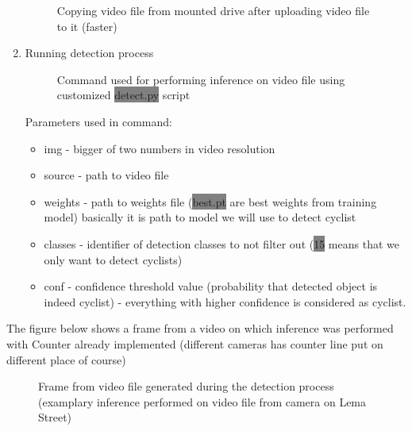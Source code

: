 \begin{enumerate}
\begin{figure} [h]
        \caption{Copying video file from mounted drive after uploading video file to it (faster)}
        \label{fig:inference3}
    \end{figure}
    \item Running detection process
    \newline \begin{figure} [h]
        \centering
        \caption{Command used for performing inference on video file using customized \colorbox{Gray}{detect.py} script}
        \label{fig:inference4}
    \end{figure}
    \newline Parameters used in command:
    \begin{itemize}
        \item img - bigger of two numbers in video resolution
        \item source - path to video file
        \item weights - path to weights file (\colorbox{Gray}{best.pt} are best weights from training model) basically it is path to model we will use to detect cyclist
        \item classes - identifier of detection classes to not filter out (\colorbox{Gray}{15} means that we only want to detect cyclists)
        \item conf - confidence threshold value (probability that detected object is indeed cyclist) - everything with higher confidence is considered as cyclist.
    \end{itemize}
\end{enumerate}
The figure below shows a frame from a video on which inference was performed with Counter already implemented (different cameras has counter line put on different place of course)
\begin{figure} [h]
    \centering
    \caption{Frame from video file generated during the detection process (examplary inference performed on video file from camera on Lema Street)}
    \label{fig:inference}
\end{figure}
